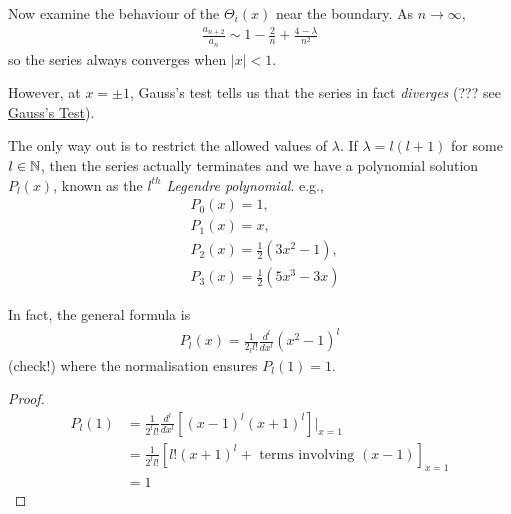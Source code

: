 \documentclass[a4paper]{article}
\begin{document}
\begin{eg}
Now examine the behaviour of the $\Theta_i\left(x\right)$ near the boundary. As $n \to \infty$,
\begin{equation*}
\begin{aligned}
\frac{a_{n+2}}{a_n} \sim 1-\frac{2}{n} + \frac{4-\lambda}{n^2}
\end{aligned}
\end{equation*}
so the series always converges when $|x|<1$.

However, at $x = \pm 1$, Gauss's test tells us that the series in fact \emph{diverges} (??? see \href{http://mathworld.wolfram.com/GausssTest.html}{Gauss's Test}).

The only way out is to restrict the allowed values of $\lambda$. If $\lambda = l\left(l+1\right)$ for some $l \in \mathbb{N}$, then the series actually terminates and we have a polynomial solution $P_l\left(x\right)$, known as the \emph{$l^{th}$ Legendre polynomial}. e.g.,
\begin{equation*}
\begin{aligned}
&P_0\left(x\right) = 1,\\
&P_1\left(x\right) = x,\\
&P_2\left(x\right) = \frac{1}{2}\left(3x^2-1\right),\\
&P_3\left(x\right) = \frac{1}{2}\left(5x^3 - 3x\right)
\end{aligned}
\end{equation*}

In fact, the general formula is
\begin{equation*}
\begin{aligned}
P_l\left(x\right) = \frac{1}{2_l l!} \frac{d^l}{dx^l} \left(x^2-1\right)^l
\end{aligned}
\end{equation*}
(check!) where the normalisation ensures $P_l\left(1\right) = 1$.
\begin{proof}
\begin{equation*}
\begin{aligned}
P_l\left(1\right) &= \frac{1}{2^l l!} \frac{d^l}{dx^l} \left[\left(x-1\right)^l \left(x+1\right)^l\right] |_{x=1}\\
&= \frac{1}{2^l l!} \left[l! \left(x+1\right)^l + \text{ terms involving } \left(x-1\right)\right]_{x=1}\\
&= 1
\end{aligned}
\end{equation*}
\end{proof}


\end{eg}
\end{document}
